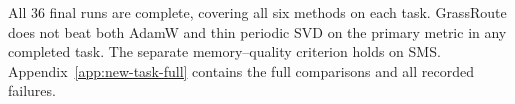 All 36 final runs are complete, covering all six methods on each task.
GrassRoute does not beat both AdamW and thin periodic SVD on the primary
metric in any completed task. The separate memory--quality criterion holds
on SMS. Appendix~\ref{app:new-task-full} contains the full comparisons and
all recorded failures.
